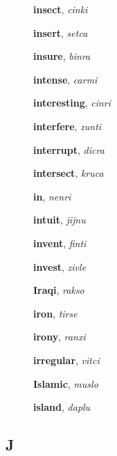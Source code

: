 \documentclass[12pt]{book}
\begin{document}
\begin{description}
\item[ ] \textbf{insect}, \textit{cinki}

\item[ ] \textbf{insert}, \textit{setca}

\item[ ] \textbf{insure}, \textit{binra}

\item[ ] \textbf{intense}, \textit{carmi}

\item[ ] \textbf{interesting}, \textit{cinri}

\item[ ] \textbf{interfere}, \textit{zunti}

\item[ ] \textbf{interrupt}, \textit{dicra}

\item[ ] \textbf{intersect}, \textit{kruca}

\item[ ] \textbf{in}, \textit{nenri}

\item[ ] \textbf{intuit}, \textit{jijnu}

\item[ ] \textbf{invent}, \textit{finti}

\item[ ] \textbf{invest}, \textit{zivle}

\item[ ] \textbf{Iraqi}, \textit{rakso}

\item[ ] \textbf{iron}, \textit{tirse}

\item[ ] \textbf{irony}, \textit{ranxi}

\item[ ] \textbf{irregular}, \textit{vitci}

\item[ ] \textbf{Islamic}, \textit{muslo}

\item[ ] \textbf{island}, \textit{daplu}



\end{description}



\subsection{J} %
\end{document}
